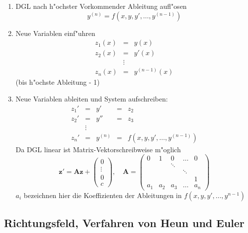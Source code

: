 \documentclass[german, 10pt, a4paper, twocolumn]{scrartcl}
\theoremstyle{definition}
\begin{document}
\begin{enumerate}
	\item DGL nach h"ochster Vorkommender Ableitung aufl"osen
		\begin{displaymath}
			y^{(n)} = f(x,y,y',\ldots,y^{(n-1)})
		\end{displaymath}
	\item Neue Variablen einf"uhren
		\begin{eqnarray*}
			z_1(x) &	= &	y(x) \\
			z_2(x) &	= &	y'(x)\\
			&		\vdots\\
			z_{n}(x) &	= &	y^{(n-1)}(x)
		\end{eqnarray*}
		(bis h"ochste Ableitung - 1)
	\item Neue Variablen ableiten und System aufschreiben:
		\begin{displaymath}
		\begin{array}{rcccl}
			z_1' &	= &	y' &		= &	z_2\\
			z_2' &	= &	y'' &		= &	z_3\\
			&	\vdots\\
			z_n' &	= &	y^{(n)} &	= &	f(x,y,y',\ldots, y^{(n-1)})
		\end{array}
		\end{displaymath}
		Da DGL linear ist Matrix-Vektorschreibweise m"oglich
		\begin{displaymath}
			\mathbf{z}' = \mathbf{A}\mathbf{z} + \left ( 
			\begin{array}{c}
				0\\
				\vdots \\
				0\\
				c
			\end{array}
			\right ), \quad
			\mathbf{A} = \left (
			\begin{array}{ccccc}
				0 &	1 &	0 &	\hdots &	0\\
				&	&	\ddots\\
				&	&	&	\ddots	 \\
				&	&	&	&		1\\
				a_1&	a_2&	a_3&	\hdots &	a_{n}
			\end{array}
			\right )
		\end{displaymath}
		$a_i$ bezeichnen hier die Koeffizienten der Ableitungen in $f(x,y,y',\ldots,y^{n-1})$
\end{enumerate}

\subsection{Richtungsfeld, Verfahren von Heun und Euler}
\end{document}
